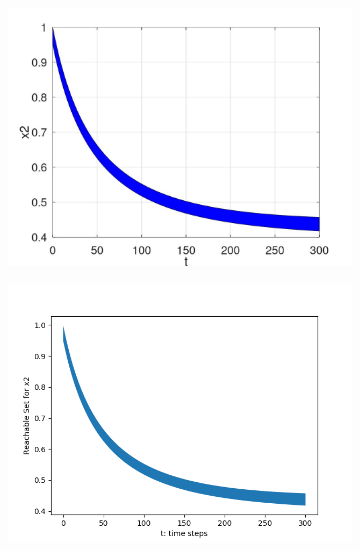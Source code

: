 \documentclass[EPiC]{easychair}
\begin{document}
\begin{figure}[h]
    \begin{subfigure}{0.47\textwidth}
    \centering
    \includegraphics[width=\textwidth]{SapoFigures/LV/SapoLV_X2.jpg}
    \end{subfigure}
    \begin{subfigure}{0.47\textwidth}
    \centering
    \includegraphics[width=1.1\textwidth,height=0.82\textwidth]{SapoFigures/LV/KaaLV_X2.png}
    \end{subfigure}
    

\end{figure}
\end{document}
